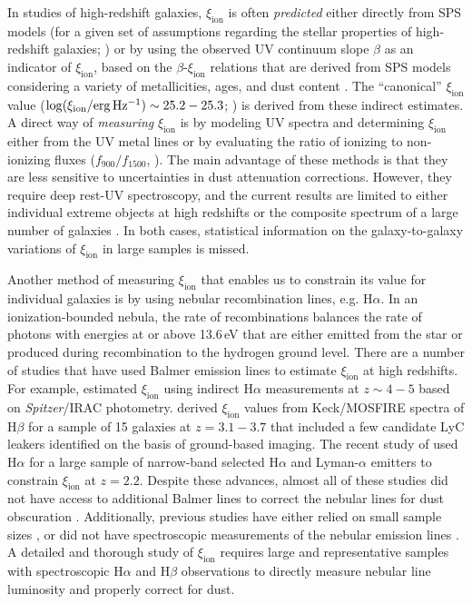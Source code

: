 \documentclass[iop]{emulateapj}
\newcommand{\xiion}{\ensuremath{\xi_{\mathrm{ion}}}}
\newcommand{\halpha}{H\ensuremath{\alpha}}
\newcommand{\hbeta}{H\ensuremath{\beta}}
\begin{document}
In studies of high-redshift galaxies, {\xiion} is often {\em predicted} either directly from SPS models (for a given set of assumptions regarding the stellar properties of high-redshift galaxies; \citealt{madau99}) or by using the observed UV continuum slope $\beta$ as an indicator of {\xiion}, based on the $\beta$-{\xiion} relations that are derived from SPS models considering a variety of metallicities, ages, and dust content \citep[e.g.,][]{robertson13,bouwens15b,duncan15}.
The ``canonical'' {\xiion} value ($\log(\xi_{\mathrm{ion}}/{\rm erg\,Hz^{-1}})\sim 25.2-25.3$; \citealt{robertson13}) is derived from these indirect estimates.
A direct way of {\em measuring} {\xiion} is by modeling UV spectra and determining {\xiion} either from the UV metal lines \citep{stark15,stark17} or by evaluating the ratio of ionizing to non-ionizing fluxes ($f_{900}/f_{1500}$, \citealt{reddy16b}). 
The main advantage of these methods is that they are less sensitive to uncertainties in dust attenuation corrections. However, they require deep rest-UV spectroscopy, and the current results are limited to either individual extreme objects at high redshifts \citep{stark17} or the composite spectrum of a large number of galaxies \citep{reddy16b}. In both cases, statistical information on the galaxy-to-galaxy variations of {\xiion} in large samples is missed. 

Another method of measuring {\xiion} that enables us to constrain its value for individual galaxies is by using nebular recombination lines, e.g. {\halpha}. 
In an ionization-bounded nebula, the rate of recombinations balances the rate of photons with energies at or above 13.6\,eV that are either emitted from the star or produced during recombination to the hydrogen ground level.
There are a number of studies that have used Balmer emission lines to estimate {\xiion} at high redshifts. For example, \citet{bouwens16b} estimated {\xiion} using indirect {\halpha} measurements at $z\sim 4-5$ based on {\em Spitzer}/IRAC photometry.
\citet{nakajima16} derived {\xiion} values from Keck/MOSFIRE spectra of {\hbeta} for a sample of 15 galaxies at $z=3.1-3.7$ that included a few candidate LyC leakers identified on the basis of ground-based imaging.
The recent study of \citet{matthee17} used {\halpha} for a large sample of narrow-band selected {\halpha} and Lyman-$\alpha$ emitters to constrain {\xiion} at $z=2.2$. 
Despite these advances, almost all of these studies did not have access to additional Balmer lines to correct the nebular lines for dust obscuration \citep{bouwens16b,nakajima16,matthee17}. Additionally, previous studies have either relied on small sample sizes \citep{nakajima16}, or did not have spectroscopic measurements of the nebular emission lines \citep{bouwens16b,matthee17}. A detailed and thorough study of {\xiion} requires large and representative samples with spectroscopic {\halpha} and {\hbeta} observations to directly measure nebular line luminosity and properly correct for dust.
\end{document}
